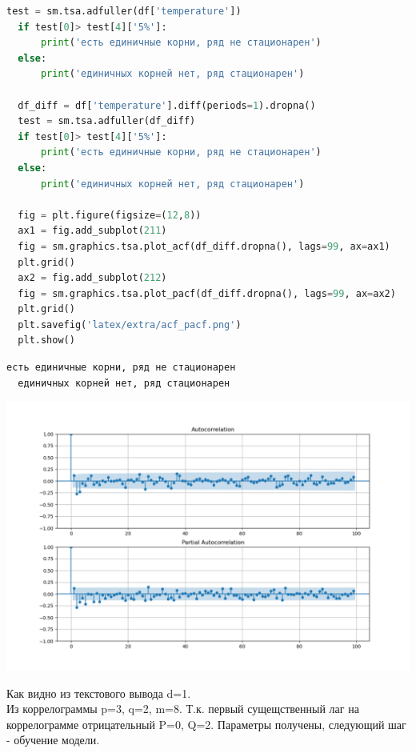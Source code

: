 \documentclass[a4paper, 12pt]{article}
\begin{document}
\begin{lstlisting}[language=Python, caption=Получение параметров модели]
  test = sm.tsa.adfuller(df['temperature'])
  if test[0]> test[4]['5%']: 
      print('есть единичные корни, ряд не стационарен')
  else:
      print('единичных корней нет, ряд стационарен')
  
  df_diff = df['temperature'].diff(periods=1).dropna()
  test = sm.tsa.adfuller(df_diff)
  if test[0]> test[4]['5%']: 
      print('есть единичные корни, ряд не стационарен')
  else:
      print('единичных корней нет, ряд стационарен')
  
  fig = plt.figure(figsize=(12,8))
  ax1 = fig.add_subplot(211)
  fig = sm.graphics.tsa.plot_acf(df_diff.dropna(), lags=99, ax=ax1)
  plt.grid()
  ax2 = fig.add_subplot(212)
  fig = sm.graphics.tsa.plot_pacf(df_diff.dropna(), lags=99, ax=ax2)
  plt.grid()
  plt.savefig('latex/extra/acf_pacf.png')
  plt.show()
\end{lstlisting}
\begin{lstlisting}[style=text, caption=Вывод кода из листинга 2]
  есть единичные корни, ряд не стационарен
  единичных корней нет, ряд стационарен
\end{lstlisting}
\begin{center}
  \centering
  \includegraphics[width=1\linewidth]{extra/acf_pacf.png}
  \label{fig:prplot}
\end{center}
Как видно из текстового вывода d=1. \\
Из коррелограммы p=3, q=2, m=8. Т.к. первый сущещственный лаг на коррелограмме отрицательный P=0, Q=2. Параметры получены, следующий шаг - обучение модели.
\end{document}

